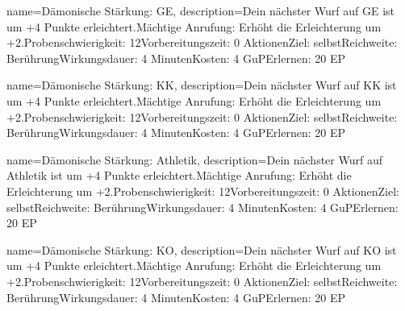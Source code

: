 {
    name={Dämonische Stärkung: GE},
    description={Dein nächster Wurf auf GE ist um +4 Punkte erleichtert.\newline Mächtige Anrufung: Erhöht die Erleichterung um +2.\newline Probenschwierigkeit: 12\newline Vorbereitungszeit: 0 Aktionen\newline Ziel: selbst\newline Reichweite: Berührung\newline Wirkungsdauer: 4 Minuten\newline Kosten: 4 GuP\newline Erlernen: 20 EP}
}


{
    name={Dämonische Stärkung: KK},
    description={Dein nächster Wurf auf KK ist um +4 Punkte erleichtert.\newline Mächtige Anrufung: Erhöht die Erleichterung um +2.\newline Probenschwierigkeit: 12\newline Vorbereitungszeit: 0 Aktionen\newline Ziel: selbst\newline Reichweite: Berührung\newline Wirkungsdauer: 4 Minuten\newline Kosten: 4 GuP\newline Erlernen: 20 EP}
}


{
    name={Dämonische Stärkung: Athletik},
    description={Dein nächster Wurf auf Athletik ist um +4 Punkte erleichtert.\newline Mächtige Anrufung: Erhöht die Erleichterung um +2.\newline Probenschwierigkeit: 12\newline Vorbereitungszeit: 0 Aktionen\newline Ziel: selbst\newline Reichweite: Berührung\newline Wirkungsdauer: 4 Minuten\newline Kosten: 4 GuP\newline Erlernen: 20 EP}
}


{
    name={Dämonische Stärkung: KO},
    description={Dein nächster Wurf auf KO ist um +4 Punkte erleichtert.\newline Mächtige Anrufung: Erhöht die Erleichterung um +2.\newline Probenschwierigkeit: 12\newline Vorbereitungszeit: 0 Aktionen\newline Ziel: selbst\newline Reichweite: Berührung\newline Wirkungsdauer: 4 Minuten\newline Kosten: 4 GuP\newline Erlernen: 20 EP}
}


